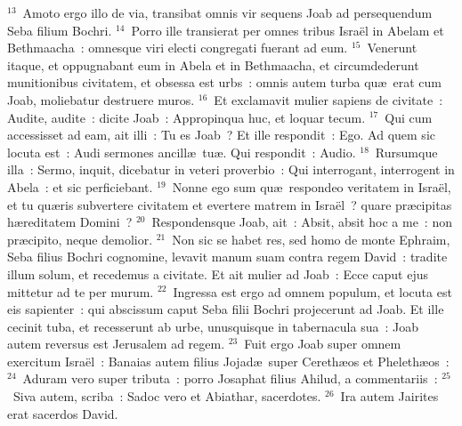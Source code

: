 ${}^{13}$~Amoto ergo illo de via, transibat omnis vir sequens Joab ad persequendum Seba filium Bochri.
${}^{14}$~Porro ille transierat per omnes tribus Isra\"el in Abelam et Bethmaacha~: omnesque viri electi congregati fuerant ad eum.
${}^{15}$~Venerunt itaque, et oppugnabant eum in Abela et in Bethmaacha, et circumdederunt munitionibus civitatem, et obsessa est urbs~: omnis autem turba qu\ae\ erat cum Joab, moliebatur destruere muros.
${}^{16}$~Et exclamavit mulier sapiens de civitate~: Audite, audite~: dicite Joab~: Appropinqua huc, et loquar tecum.
${}^{17}$~Qui cum accessisset ad eam, ait illi~: Tu es Joab~? Et ille respondit~: Ego. Ad quem sic locuta est~: Audi sermones ancill\ae\ tu\ae . Qui respondit~: Audio.
${}^{18}$~Rursumque illa~: Sermo, inquit, dicebatur in veteri proverbio~: Qui interrogant, interrogent in Abela~: et sic perficiebant.
${}^{19}$~Nonne ego sum qu\ae\ respondeo veritatem in Isra\"el, et tu qu\ae ris subvertere civitatem et evertere matrem in Isra\"el~? quare pr\ae cipitas h\ae reditatem Domini~?
${}^{20}$~Respondensque Joab, ait~: Absit, absit hoc a me~: non pr\ae cipito, neque demolior.
${}^{21}$~Non sic se habet res, sed homo de monte Ephraim, Seba filius Bochri cognomine, levavit manum suam contra regem David~: tradite illum solum, et recedemus a civitate. Et ait mulier ad Joab~: Ecce caput ejus mittetur ad te per murum.
${}^{22}$~Ingressa est ergo ad omnem populum, et locuta est eis sapienter~: qui abscissum caput Seba filii Bochri projecerunt ad Joab. Et ille cecinit tuba, et recesserunt ab urbe, unusquisque in tabernacula sua~: Joab autem reversus est Jerusalem ad regem.
${}^{23}$~Fuit ergo Joab super omnem exercitum Isra\"el~: Banaias autem filius Jojad\ae\ super Cereth\ae os et Pheleth\ae os~:
${}^{24}$~Aduram vero super tributa~: porro Josaphat filius Ahilud, a commentariis~:
${}^{25}$~Siva autem, scriba~: Sadoc vero et Abiathar, sacerdotes.
${}^{26}$~Ira autem Jairites erat sacerdos David.

